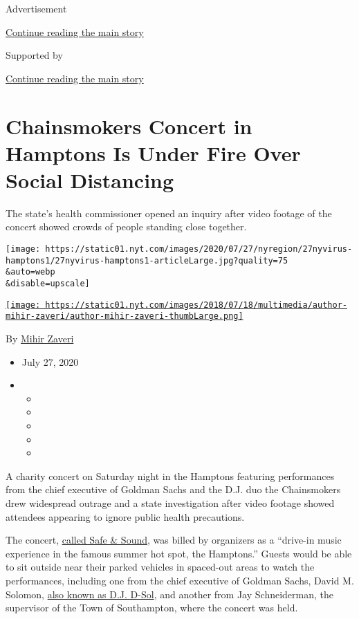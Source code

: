 Advertisement

\protect\hyperlink{after-top}{Continue reading the main story}

Supported by

\protect\hyperlink{after-sponsor}{Continue reading the main story}

\hypertarget{chainsmokers-concert-in-hamptons-is-under-fire-over-social-distancing}{%
\section{Chainsmokers Concert in Hamptons Is Under Fire Over Social
Distancing}\label{chainsmokers-concert-in-hamptons-is-under-fire-over-social-distancing}}

The state's health commissioner opened an inquiry after video footage of
the concert showed crowds of people standing close together.

\texttt{[image: https://static01.nyt.com/images/2020/07/27/nyregion/27nyvirus-hamptons1/27nyvirus-hamptons1-articleLarge.jpg?quality=75\\\&auto=webp\\\&disable=upscale]}

\href{https://www.nytimes.com/by/mihir-zaveri}{\texttt{[image: https://static01.nyt.com/images/2018/07/18/multimedia/author-mihir-zaveri/author-mihir-zaveri-thumbLarge.png]}}

By \href{https://www.nytimes.com/by/mihir-zaveri}{Mihir Zaveri}

\begin{itemize}
\item
  July 27, 2020
\item
  \begin{itemize}
  \item
  \item
  \item
  \item
  \item
  \end{itemize}
\end{itemize}

A charity concert on Saturday night in the Hamptons featuring
performances from the chief executive of Goldman Sachs and the D.J. duo
the Chainsmokers drew widespread outrage and a state investigation after
video footage showed attendees appearing to ignore public health
precautions.

The concert,
\href{https://www.tixr.com/groups/intheknow/events/jaja-presents-safe-sound-hamptons-chainsmokers-18912}{called
Safe \& Sound}, was billed by organizers as a ``drive-in music
experience in the famous summer hot spot, the Hamptons.'' Guests would
be able to sit outside near their parked vehicles in spaced-out areas to
watch the performances, including one from the chief executive of
Goldman Sachs, David M. Solomon,
\href{https://www.nytimes.com/2017/07/13/business/dealbook/goldman-sachs-david-solomon-dj-d-sol.html}{also
known as D.J. D-Sol}, and another from Jay Schneiderman, the supervisor
of the Town of Southampton, where the concert was held.

